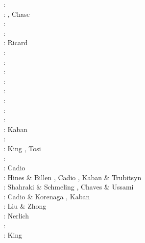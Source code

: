 \begin{scriptsize}
\nineteeneightyfour: \cite{davi84}\cite{hage84}\cite{riff84}\cite{riha84}\\
\nineteeneightyfive: \cite{hacr85}, Chase \cite{chas85}\\
\nineteeneightysix: \cite{davi86}\\
\nineteeneightyeight: \cite{besz88}\cite{fope88}\\
\nineteeneightynine: Ricard \etal \cite{rivf89}\\
\nineteenninetytwo: \cite{zhgu92}\cite{kiha92}\\
\nineteenninetythree: \cite{zhch93}\cite{rirl93}\\
\nineteenninetyfour: \cite{kiha94}\\
\nineteenninetyfive: \cite{king95}\cite{mopa95}\\
\nineteenninetysix: \cite{mogu96}\\
\nineteenninetyseven: \cite{wean97a}\\
\nineteenninetyeight: \cite{cava98}\cite{chki98}\\
\twothousandone: \cite{zhon01}\\
\twothousandseven: Kaban \etal \cite{kart07}\\
\twothousandeight: \cite{meco08}\\
\twothousandnine: King \cite{king09}, Tosi \etal \cite{tocm09}\\
\twothousandten: \cite{ghbz10}\cite{spgs10b}\\
\twothousandeleven: Cadio \etal \cite{capd11}\\
\twothousandtwelve: Hines \& Billen \cite{hibi12}, Cadio \etal \cite{cabp12}, 
                    Kaban \& Trubitsyn \cite{katr12}\\
\twothousandthirteen: Shahraki \& Schmeling \cite{shsc13}, Chaves \& Ussami \cite{chus13}\\
\twothousandfourteen: Cadio \& Korenaga \cite{cako14}, Kaban \etal \cite{kaps14}\\
\twothousandfifteen: Liu \& Zhong \cite{lizh15}\\
\twothousandsixteen: Nerlich \etal \cite{necg16}\\
\twothousandseventeen: \cite{grab17}\\
\twothousandeighteen: King \cite{king18}
\end{scriptsize}

